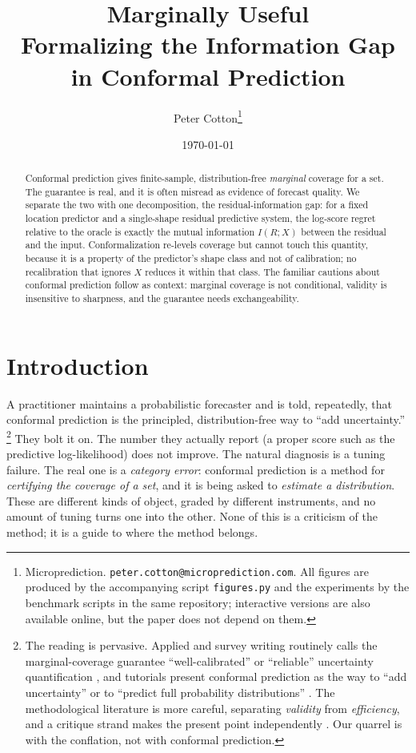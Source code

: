 \documentclass[11pt]{article}
\title{Marginally Useful\\[2pt]
\large Formalizing the Information Gap in Conformal Prediction}
\author{Peter Cotton\thanks{Microprediction. \texttt{peter.cotton@microprediction.com}.
All figures are produced by the accompanying script \texttt{figures.py} and the experiments
by the benchmark scripts in the same repository; interactive versions are also available
online, but the paper does not depend on them.}}
\date{\today}
\theoremstyle{definition}
\begin{document}
\maketitle

\begin{abstract}
Conformal prediction gives finite-sample, distribution-free \emph{marginal} coverage for a
set. The guarantee is real, and it is often misread as evidence of forecast quality. We
separate the two with one decomposition, the residual-information gap: for a fixed location
predictor and a single-shape residual predictive system, the log-score regret relative to the
oracle is exactly the mutual information $I(R;X)$ between the residual and the input.
Conformalization re-levels coverage but cannot touch this quantity, because it is a property
of the predictor's shape class and not of calibration; no recalibration that ignores $X$
reduces it within that class. The familiar cautions about conformal prediction follow as context: marginal coverage is
not conditional, validity is insensitive to sharpness, and the guarantee needs
exchangeability.
\end{abstract}

\section{Introduction}

A practitioner maintains a probabilistic forecaster and is told, repeatedly, that
conformal prediction is the principled, distribution-free way to ``add uncertainty.''%
\footnote{The reading is pervasive. Applied and survey writing routinely calls the
marginal-coverage guarantee ``well-calibrated'' or ``reliable'' uncertainty quantification
\citep{bellotti2025trustworthy}, and tutorials present conformal prediction as the way to
``add uncertainty'' \citep{tds_adduncertainty} or to ``predict full probability
distributions'' \citep{manokhin_fulldist}. The methodological literature is more careful,
separating \emph{validity} from \emph{efficiency}, and a critique strand makes the present
point independently \citep{pitfalls2025medical,min2026coveragelength}. Our quarrel is with
the conflation, not with conformal prediction.}
They bolt it on. The number they actually report (a proper score such as the
predictive log-likelihood) does not improve. The natural diagnosis is a tuning
failure. The real one is a \emph{category error}: conformal
prediction is a method for \emph{certifying the coverage of a set}, and it is being
asked to \emph{estimate a distribution}. These are different kinds of object, graded
by different instruments, and no amount of tuning turns one into the other. None of
this is a criticism of the method; it is a guide to where the method belongs.
\end{document}
